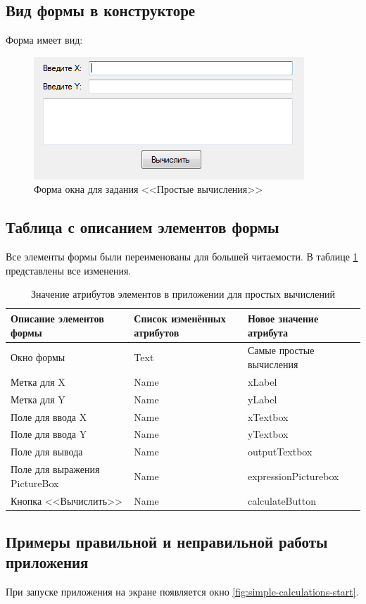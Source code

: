 \subsection{Вид формы в конструкторе}
Форма имеет вид:

\begin{figure}
\centering
\includegraphics[width=0.5\linewidth]{images/simple-calculations/form.png}
\caption{Форма окна для задания <<Простые вычисления>>}
\label{simple-calculations-form}
\end{figure}

\subsection{Таблица с описанием элементов формы}
Все элементы формы были переименованы для большей читаемости. В таблице \ref{tab:simple-calculations-form} представлены все изменения.

\begin{table}
\centering
\begin{tabular}{|m{}|m{}|m{}|}
\hline
\textbf{Описание элементов формы} & \textbf{Список изменённых атрибутов} & \textbf{Новое значение атрибута} \\
\hline
\hline
Окно формы & Text & Самые простые вычисления \\
Метка для X & Name & xLabel\\
Метка для Y & Name & yLabel \\
Поле для ввода X & Name & xTextbox \\
Поле для ввода Y & Name & yTextbox \\
Поле для вывода & Name & outputTextbox \\
Поле для выражения PictureBox & Name & expressionPicturebox \\
Кнопка <<Вычислить>> & Name & calculateButton \\
\hline
\end{tabular}
\caption{Значение атрибутов элементов в приложении для простых вычислений}
\label{tab:simple-calculations-form}
\end{table}

\subsection{Примеры правильной и неправильной работы приложения}
При запуске приложения на экране появляется окно \ref{fig:simple-calculations-start}.

